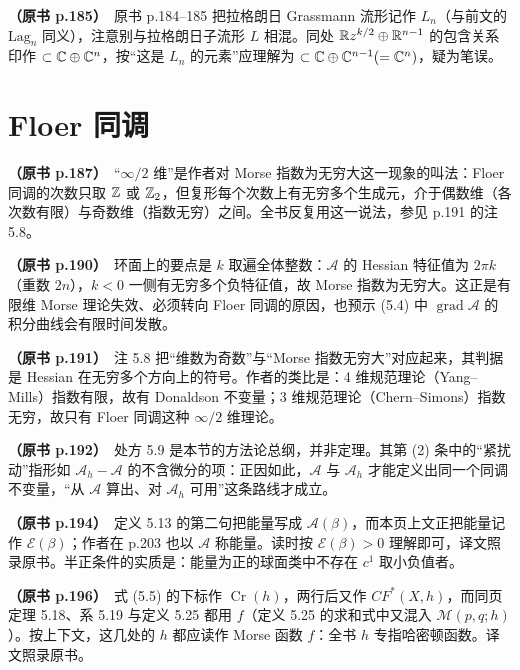 \noindent \textbf{（原书 p.185）}\ 原书 p.184–185 把拉格朗日 Grassmann 流形记作 $L_n$（与前文的 $\mathrm{Lag}_n$ 同义），注意别与拉格朗日子流形 $L$ 相混。同处 $\mathbb{R} z^{k/2}\oplus\mathbb{R}^{n-1}$ 的包含关系印作 $\subset\mathbb{C}\oplus\mathbb{C}^n$，按“这是 $L_n$ 的元素”应理解为 $\subset\mathbb{C}\oplus\mathbb{C}^{n-1}(=\mathbb{C}^n)$，疑为笔误。\par\smallskip

\section*{Floer 同调}

\noindent \textbf{（原书 p.187）}\ “$\infty/2$ 维”是作者对 Morse 指数为无穷大这一现象的叫法：Floer 同调的次数只取 $\mathbb{Z}$ 或 $\mathbb{Z}_2$，但复形每个次数上有无穷多个生成元，介于偶数维（各次数有限）与奇数维（指数无穷）之间。全书反复用这一说法，参见 p.191 的注 5.8。\par\smallskip

\noindent \textbf{（原书 p.190）}\ 环面上的要点是 $k$ 取遍全体整数：$\mathcal{A}$ 的 Hessian 特征值为 $2\pi k$（重数 $2n$），$k<0$ 一侧有无穷多个负特征值，故 Morse 指数为无穷大。这正是有限维 Morse 理论失效、必须转向 Floer 同调的原因，也预示 (5.4) 中 $\operatorname{grad}\mathcal{A}$ 的积分曲线会有限时间发散。\par\smallskip

\noindent \textbf{（原书 p.191）}\ 注 5.8 把“维数为奇数”与“Morse 指数无穷大”对应起来，其判据是 Hessian 在无穷多个方向上的符号。作者的类比是：4 维规范理论（Yang–Mills）指数有限，故有 Donaldson 不变量；3 维规范理论（Chern–Simons）指数无穷，故只有 Floer 同调这种 $\infty/2$ 维理论。\par\smallskip

\noindent \textbf{（原书 p.192）}\ 处方 5.9 是本节的方法论总纲，并非定理。其第 (2) 条中的“紧扰动”指形如 $\mathcal{A}_h-\mathcal{A}$ 的不含微分的项：正因如此，$\mathcal{A}$ 与 $\mathcal{A}_h$ 才能定义出同一个同调不变量，“从 $\mathcal{A}$ 算出、对 $\mathcal{A}_h$ 可用”这条路线才成立。\par\smallskip

\noindent \textbf{（原书 p.194）}\ 定义 5.13 的第二句把能量写成 $\mathcal{A}(\beta)$，而本页上文正把能量记作 $\mathcal{E}(\beta)$；作者在 p.203 也以 $\mathcal{A}$ 称能量。读时按 $\mathcal{E}(\beta)>0$ 理解即可，译文照录原书。半正条件的实质是：能量为正的球面类中不存在 $c^1$ 取小负值者。\par\smallskip

\noindent \textbf{（原书 p.196）}\ 式 (5.5) 的下标作 $\operatorname{Cr}(h)$，两行后又作 $CF^*(X,h)$，而同页定理 5.18、系 5.19 与定义 5.25 都用 $f$（定义 5.25 的求和式中又混入 $\mathcal{M}(p,q;h)$）。按上下文，这几处的 $h$ 都应读作 Morse 函数 $f$：全书 $h$ 专指哈密顿函数。译文照录原书。\par\smallskip

